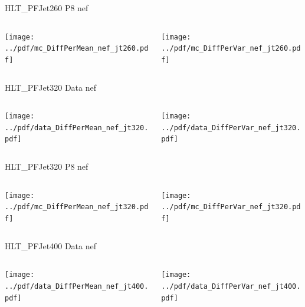 \documentclass[9pt]{beamer}
\begin{document}
\begin{frame}[t]{HLT\_PFJet260 P8 nef}
\begin{columns}[T]
  \begin{column}{.5\textwidth}
  \texttt{[image: ../pdf/mc\_DiffPerMean\_nef\_jt260.pdf]}
  \end{column}
  \begin{column}{.5\textwidth}
  \texttt{[image: ../pdf/mc\_DiffPerVar\_nef\_jt260.pdf]}
  \end{column}
\end{columns}
\end{frame}

\begin{frame}[t]{HLT\_PFJet320 Data nef}
\begin{columns}[T]
  \begin{column}{.5\textwidth}
  \texttt{[image: ../pdf/data\_DiffPerMean\_nef\_jt320.pdf]}
  \end{column}
  \begin{column}{.5\textwidth}
  \texttt{[image: ../pdf/data\_DiffPerVar\_nef\_jt320.pdf]}
  \end{column}
\end{columns}
\end{frame}

\begin{frame}[t]{HLT\_PFJet320 P8 nef}
\begin{columns}[T]
  \begin{column}{.5\textwidth}
  \texttt{[image: ../pdf/mc\_DiffPerMean\_nef\_jt320.pdf]}
  \end{column}
  \begin{column}{.5\textwidth}
  \texttt{[image: ../pdf/mc\_DiffPerVar\_nef\_jt320.pdf]}
  \end{column}
\end{columns}
\end{frame}

\begin{frame}[t]{HLT\_PFJet400 Data nef}
\begin{columns}[T]
  \begin{column}{.5\textwidth}
  \texttt{[image: ../pdf/data\_DiffPerMean\_nef\_jt400.pdf]}
  \end{column}
  \begin{column}{.5\textwidth}
  \texttt{[image: ../pdf/data\_DiffPerVar\_nef\_jt400.pdf]}
  \end{column}
\end{columns}
\end{frame}
\end{document}

